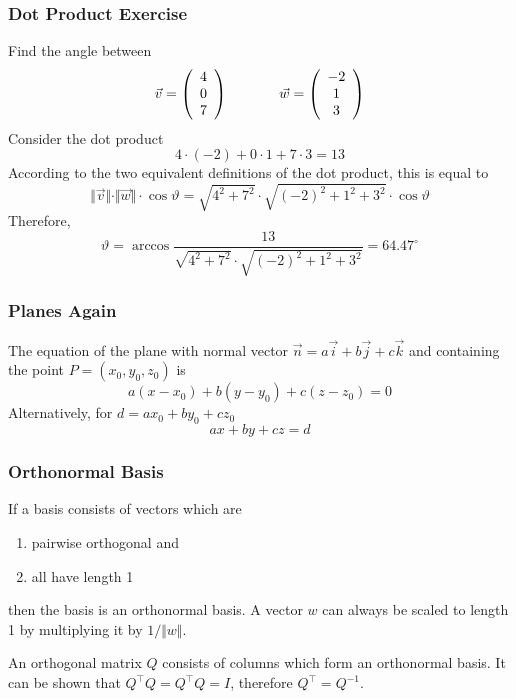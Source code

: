 \documentclass[xcolor=dvipsnames]{beamer}
\begin{document}
\begin{frame}
  \frametitle{Dot Product Exercise}
  {\ubung} Find the angle between
  \begin{equation}
    \label{eq:tauhohju}
    \vec{v}=\left(
      \begin{array}{c}
        4 \\
        0 \\
        7
      \end{array}\right)\hspace{.5in}\vec{w}=\left(
      \begin{array}{c}
        -2 \\
        1 \\
        3
      \end{array}\right)
  \end{equation}
  Consider the dot product
  \begin{equation}
    \label{eq:ijaquahd}
    4\cdot(-2)+0\cdot{}1+7\cdot{}3=13
  \end{equation}
According to the two equivalent definitions of the dot product, this
is equal to
\begin{equation}
  \label{eq:ohyizaeb}
  \Vert\vec{v}\Vert\cdot\Vert\vec{w}\Vert\cdot\cos\vartheta=\sqrt{4^{2}+7^{2}}\cdot\sqrt{(-2)^{2}+1^{2}+3^{2}}\cdot\cos\vartheta
\end{equation}
Therefore,
\begin{equation}
  \label{eq:yohsheen}
  \vartheta=\arccos\frac{13}{\sqrt{4^{2}+7^{2}}\cdot\sqrt{(-2)^{2}+1^{2}+3^{2}}}=64.47^{\circ}
\end{equation}
\end{frame}

\begin{frame}
  \frametitle{Planes Again}
  The equation of the plane with normal vector
  $\vec{n}=a\vec{i}+b\vec{j}+c\vec{k}$ and containing the point
  $P=(x_{0},y_{0},z_{0})$ is
  \begin{equation}
    \label{eq:ijaeriri}
    a(x-x_{0})+b(y-y_{0})+c(z-z_{0})=0
  \end{equation}
  Alternatively, for $d=ax_{0}+by_{0}+cz_{0}$
  \begin{equation}
    \label{eq:bamoyeez}
    ax+by+cz=d
  \end{equation}
\end{frame}

\begin{frame}
  \frametitle{Orthonormal Basis}
  If a basis consists of vectors which are
  \begin{enumerate}
  \item pairwise orthogonal and
  \item all have length 1
  \end{enumerate}
  then the basis is an \alert{orthonormal basis}. A vector $w$ can always
  be scaled to length 1 by multiplying it by $1/\Vert{}w\Vert$.

  \medskip

  An orthogonal matrix $Q$ consists of columns which form an orthonormal
  basis. It can be shown that $Q^{\intercal}Q=Q^{\intercal}Q=I$,
  therefore $Q^{\intercal}=Q^{-1}$. 
\end{frame}
\end{document}
